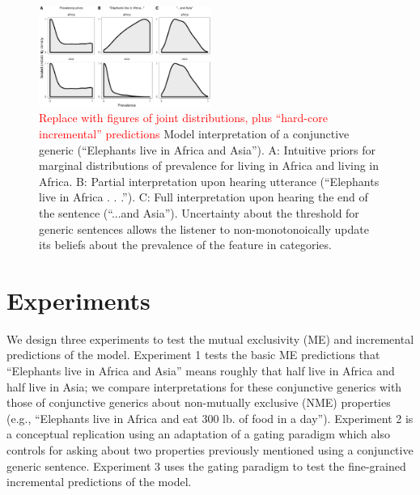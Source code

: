 \documentclass[10pt,letterpaper]{article}
\providecommand{\tightlist}{%
  \setlength{\itemsep}{0pt}\setlength{\parskip}{0pt}}
\newcommand{\denote}[1]{\mbox{ $[\![ #1 ]\!]$}}
\newcommand{\red}[1]{{\textcolor{Red}{#1}}}
\begin{document}
\begin{figure}[h]
  \centering
    \includegraphics[width=0.5\textwidth]{model}
  \caption{
  \red{Replace with figures of joint distributions, plus ``hard-core incremental'' predictions}
  Model interpretation of a conjunctive generic (``Elephants live in Africa and Asia''). A: Intuitive priors for marginal distributions of prevalence for living in Africa and living in Africa. B: Partial interpretation upon hearing utterance (“Elephants live in Africa . . .”). C: Full interpretation upon hearing the end of the sentence (``...and Asia''). Uncertainty about the threshold for generic sentences allows the listener to non-monotonoically update its beliefs about the prevalence of the feature in categories.
  }
  \label{fig:model}
\end{figure}



%


\section{Experiments}

We design three experiments to test the mutual exclusivity (ME) and incremental predictions of the model. 
Experiment 1 tests the basic ME predictions that ``Elephants live in Africa and Asia'' means roughly that half live in Africa and half live in Asia; we compare interpretations for these conjunctive generics with those of conjunctive generics about non-mutually exclusive (NME) properties (e.g., ``Elephants live in Africa and eat 300 lb. of food in a day''). 
Experiment 2 is a conceptual replication using an adaptation of a gating paradigm \cite{Grosjean1980} which also controls for asking about two properties previously mentioned using a conjunctive generic sentence. 
Experiment 3 uses the gating paradigm to test the fine-grained incremental predictions of the model.
\end{document}
